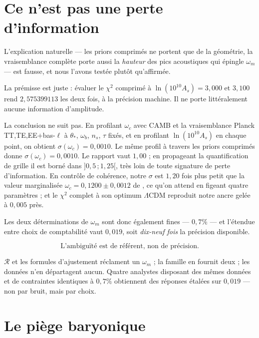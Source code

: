 \documentclass[11pt,a4paper]{article}
\begin{document}
\section{Ce n'est pas une perte d'information}
\label{sec:pouvoir}

L'explication naturelle --- les priors comprimés ne portent que de la géométrie, la
vraisemblance complète porte aussi la \emph{hauteur} des pics acoustiques qui épingle
$\omega_m$ --- est fausse, et nous l'avons testée plutôt qu'affirmée.

La prémisse est juste : évaluer le $\chi^2$ comprimé à $\ln(10^{10}A_s)=3{,}000$ et
$3{,}100$ rend $2{,}575399113$ les deux fois, à la précision machine. Il ne porte
littéralement aucune information d'amplitude.

La conclusion ne suit pas. En profilant $\omega_c$ avec CAMB et la vraisemblance Planck
TT,TE,EE$+$bas-$\ell$ à $\theta_\ast$, $\omega_b$, $n_s$, $\tau$ fixés, et en profilant
$\ln(10^{10}A_s)$ en chaque point, on obtient $\sigma(\omega_c)=0{,}0010$. Le même profil à
travers les priors comprimés donne $\sigma(\omega_c)=0{,}0010$. Le rapport vaut $1{,}00$ ;
en propageant la quantification de grille il est borné dans $]0{,}5\,;1{,}25[$, très loin de
toute signature de perte d'information. En contrôle de cohérence, notre $\sigma$ est $1{,}20$
fois plus petit que la valeur marginalisée $\omega_c=0{,}1200\pm0{,}0012$ de
\citet{planck2018}, ce qu'on attend en figeant quatre paramètres ; et le $\chi^2$ complet à
son optimum $\Lambda$CDM reproduit notre ancre gelée à $0{,}005$ près.

Les deux déterminations de $\omega_m$ sont donc également fines --- $0{,}7\%$ --- et
l'étendue entre choix de comptabilité vaut $0{,}019$, soit \emph{dix-neuf fois} la précision
disponible.

\begin{equation}
\boxed{\;\text{L'ambiguïté est de référent, non de précision.}\;}
\end{equation}

$\mathcal{R}$ et les formules d'ajustement réclament un $\omega_m$ ; la famille en fournit
deux ; les données n'en départagent aucun. Quatre analystes disposant des mêmes données et de
contraintes identiques à $0{,}7\%$ obtiennent des réponses étalées sur $0{,}019$ --- non par
bruit, mais par choix.

\section{Le piège baryonique}
\label{sec:baryons}
\end{document}
